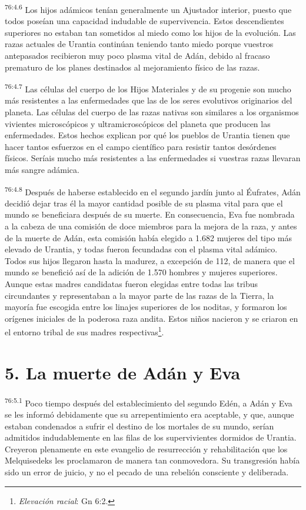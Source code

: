 \par
\textsuperscript{76:4.6} Los hijos adámicos tenían generalmente un Ajustador interior, puesto que todos poseían una capacidad indudable de supervivencia. Estos descendientes superiores no estaban tan sometidos al miedo como los hijos de la evolución. Las razas actuales de Urantia continúan teniendo tanto miedo porque vuestros antepasados recibieron muy poco plasma vital de Adán, debido al fracaso prematuro de los planes destinados al mejoramiento físico de las razas.

\par
\textsuperscript{76:4.7} Las células del cuerpo de los Hijos Materiales y de su progenie son mucho más resistentes a las enfermedades que las de los seres evolutivos originarios del planeta. Las células del cuerpo de las razas nativas son similares a los organismos vivientes microscópicos y ultramicroscópicos del planeta que producen las enfermedades. Estos hechos explican por qué los pueblos de Urantia tienen que hacer tantos esfuerzos en el campo científico para resistir tantos desórdenes físicos. Seríais mucho más resistentes a las enfermedades si vuestras razas llevaran más sangre adámica.

\par
\textsuperscript{76:4.8} Después de haberse establecido en el segundo jardín junto al
Éufrates, Adán decidió dejar tras él la mayor cantidad posible de su plasma vital para que el mundo se beneficiara después de su muerte. En consecuencia, Eva fue nombrada a la cabeza de una comisión de doce miembros para la mejora de la raza, y antes de la muerte de Adán, esta comisión había elegido a 1.682 mujeres del tipo más elevado de Urantia, y todas fueron fecundadas con el plasma vital adámico. Todos sus hijos llegaron hasta la madurez, a excepción de 112, de manera que el mundo se benefició así de la adición de 1.570 hombres y mujeres superiores. Aunque estas madres candidatas fueron elegidas entre todas las tribus circundantes y representaban a la mayor parte de las razas de la Tierra, la mayoría fue escogida entre los linajes superiores de los noditas, y formaron los orígenes iniciales de la poderosa raza andita. Estos niños nacieron y se criaron en el entorno tribal de sus madres respectivas\footnote{\textit{Elevación racial}: Gn 6:2.}.

\section*{5. La muerte de Adán y Eva}
\par
\textsuperscript{76:5.1} Poco tiempo después del establecimiento del segundo Edén, a Adán y Eva se les informó debidamente que su arrepentimiento era aceptable, y que, aunque estaban condenados a sufrir el destino de los mortales de su mundo, serían admitidos indudablemente en las filas de los supervivientes dormidos de Urantia. Creyeron plenamente en este evangelio de resurrección y rehabilitación que los Melquisedeks les proclamaron de manera tan conmovedora. Su transgresión había sido un error de juicio, y no el pecado de una rebelión consciente y deliberada.

